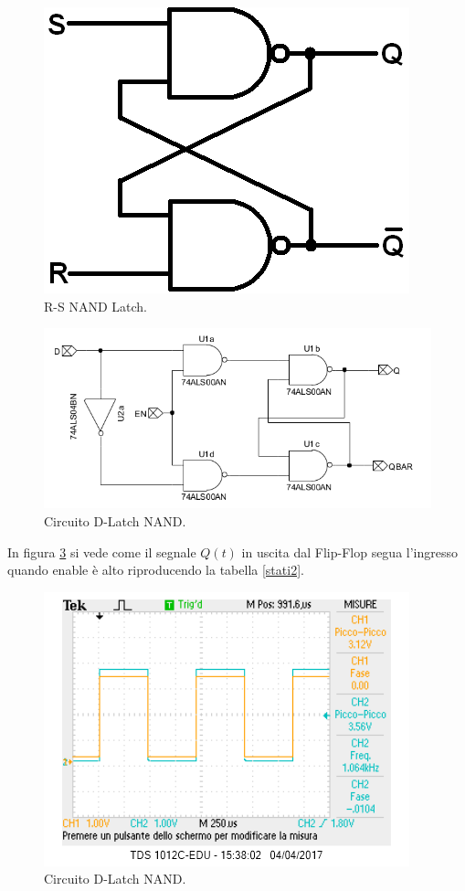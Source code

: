 \documentclass[10pt,a4paper]{article}
\begin{document}
\begin{figure}
\centering
\includegraphics[scale=0.5]{latchNand.png}
\caption{R-S NAND Latch.\label{latch}}
\end{figure}

\begin{figure}
\centering
\includegraphics[scale=0.7]{flipflopDlatch.png}
\caption{Circuito D-Latch NAND.\label{circuito}}
\end{figure}

In figura \ref{segue} si vede come il segnale $Q(t)$ in uscita dal Flip-Flop segua l'ingresso quando enable è alto riproducendo la tabella \ref{stati2}.\\

\begin{figure}
\centering
\includegraphics[scale=1.0]{FFD1in2Q.png}
\caption{Circuito  D-Latch NAND.\label{segue}}
\end{figure}
\end{document}
